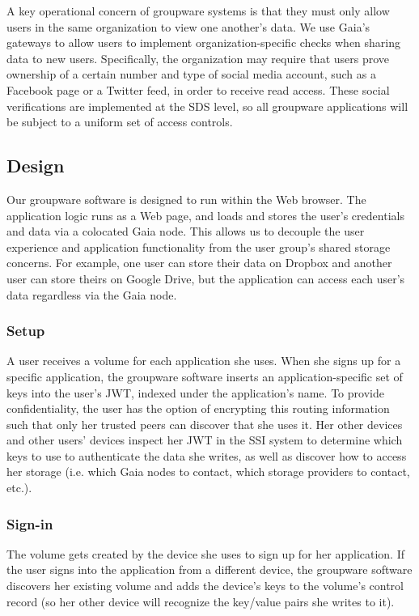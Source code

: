 A key operational concern of groupware systems is that they must only allow
users in the same organization to view one another's data.  We use Gaia's
gateways to allow users to implement organization-specific checks when sharing
data to new users.  Specifically, the organization may require that users prove
ownership of a certain number and type of social media account, such as a
Facebook page or a Twitter feed, in order to receive read access.  These
social verifications are implemented at the SDS level, so all groupware
applications will be subject to a uniform set of access controls.

\subsection{Design}

Our groupware software is designed to run within the Web browser.  The
application logic runs as a Web page, and loads and stores the user's
credentials and data via a colocated Gaia node.  This allows us to decouple the
user experience and application functionality from the user group's shared
storage concerns.  For example, one user can store their data on Dropbox and
another user can store theirs on Google Drive, but the application can access
each user's data regardless via the Gaia node.

\subsubsection{Setup}

A user receives a volume for each application she uses.  When she signs up for a specific
application, the groupware software inserts an application-specific set of keys
into the user's JWT, indexed under the application's name.  To provide
confidentiality, the user has the option of encrypting this routing information
such that only her trusted peers can discover that she uses it.  Her other
devices and other users' devices inspect her JWT in the SSI system to determine
which keys to use to authenticate the data she writes, as well as discover how
to access her storage (i.e. which Gaia nodes to contact, which storage providers
to contact, etc.).

\subsubsection{Sign-in}

The volume gets created by the device she uses to sign up for her application.
If the user signs into the application from a different device, the groupware
software discovers her existing volume and adds the device's keys to the
volume's control record (so her other device will recognize the key/value pairs
she writes to it).

